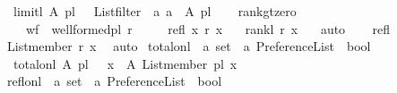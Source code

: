 \begin{isabellebody}
\ \ {\isachardoublequoteopen}limit{\isacharunderscore}{\kern0pt}l\ A\ pl\ {\isacharequal}{\kern0pt}\ \ List{\isachardot}{\kern0pt}filter\ {\isacharparenleft}{\kern0pt}{\isasymlambda}\ a{\isachardot}{\kern0pt}\ a\ {\isasymin}\ A{\isacharparenright}{\kern0pt}\ pl{\isachardoublequoteclose}\isanewline
\ \ \isanewline
{}\isamarkupfalse%
\ rank{\isacharunderscore}{\kern0pt}gt{\isacharunderscore}{\kern0pt}zero{\isacharcolon}{\kern0pt}\isanewline
\ \ \isanewline
\ \ \ \ wf\ {\isacharcolon}{\kern0pt}\ {\isachardoublequoteopen}well{\isacharunderscore}{\kern0pt}formed{\isacharunderscore}{\kern0pt}pl\ r{\isachardoublequoteclose}\ \isanewline
\ \ \ \ refl{\isacharcolon}{\kern0pt}\ {\isachardoublequoteopen}x\ {\isasymlesssim}\isactrlsub r\ x{\isachardoublequoteclose}\isanewline
\ \ \ {\isachardoublequoteopen}rank{\isacharunderscore}{\kern0pt}l\ r\ x\ {\isasymge}\ {}{\isachardoublequoteclose}\isanewline
%
\isadelimproof
%
\endisadelimproof
%
\isatagproof
{}\isamarkupfalse%
\ auto\isanewline
\ \ \isamarkupfalse%
\ refl\ \isamarkupfalse%
\ {\isachardoublequoteopen}List{\isachardot}{\kern0pt}member\ r\ x{\isachardoublequoteclose}\ \isamarkupfalse%
\ auto\isanewline
{}\isamarkupfalse%
%
\endisatagproof
{\isafoldproof}%
%
\isadelimproof
\isanewline
%
\endisadelimproof
\isanewline
\isanewline
{}\isamarkupfalse%
\ total{\isacharunderscore}{\kern0pt}on{\isacharunderscore}{\kern0pt}l\ {\isacharcolon}{\kern0pt}{\isacharcolon}{\kern0pt}\ {\isachardoublequoteopen}{\isacharprime}{\kern0pt}a\ set\ {\isasymRightarrow}\ {\isacharprime}{\kern0pt}a\ Preference{\isacharunderscore}{\kern0pt}List\ {\isasymRightarrow}\ bool{\isachardoublequoteclose}\ \isanewline
\ \ {\isachardoublequoteopen}total{\isacharunderscore}{\kern0pt}on{\isacharunderscore}{\kern0pt}l\ A\ pl\ {\isasymequiv}\ {\isacharparenleft}{\kern0pt}{\isasymforall}\ x\ {\isasymin}\ A{\isachardot}{\kern0pt}\ {\isacharparenleft}{\kern0pt}List{\isachardot}{\kern0pt}member\ pl\ x{\isacharparenright}{\kern0pt}{\isacharparenright}{\kern0pt}{\isachardoublequoteclose}\isanewline
\isanewline
{}\isamarkupfalse%
\ refl{\isacharunderscore}{\kern0pt}on{\isacharunderscore}{\kern0pt}l\ {\isacharcolon}{\kern0pt}{\isacharcolon}{\kern0pt}\ {\isachardoublequoteopen}{\isacharprime}{\kern0pt}a\ set\ {\isasymRightarrow}\ {\isacharprime}{\kern0pt}a\ Preference{\isacharunderscore}{\kern0pt}List\ {\isasymRightarrow}\ bool{\isachardoublequoteclose}\ \ \isanewline

\end{isabellebody}
